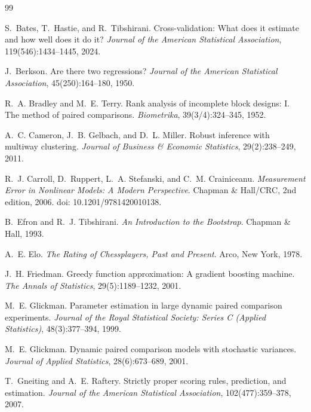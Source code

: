 \documentclass{article}
\begin{document}
\begin{thebibliography}{99}

S.~Bates, T.~Hastie, and R.~Tibshirani.
\newblock Cross-validation: What does it estimate and how well does it do it?
\newblock \emph{Journal of the American Statistical Association}, 119(546):1434--1445, 2024.

J.~Berkson.
\newblock Are there two regressions?
\newblock \emph{Journal of the American Statistical Association}, 45(250):164--180, 1950.

R.~A. Bradley and M.~E. Terry.
\newblock Rank analysis of incomplete block designs: I. The method of paired comparisons.
\newblock \emph{Biometrika}, 39(3/4):324--345, 1952.

A.~C. Cameron, J.~B. Gelbach, and D.~L. Miller.
\newblock Robust inference with multiway clustering.
\newblock \emph{Journal of Business \& Economic Statistics}, 29(2):238--249, 2011.

R.~J. Carroll, D.~Ruppert, L.~A. Stefanski, and C.~M. Crainiceanu.
\newblock \emph{Measurement Error in Nonlinear Models: A Modern Perspective}.
\newblock Chapman \& Hall/CRC, 2nd edition, 2006. doi: 10.1201/9781420010138.

B.~Efron and R.~J. Tibshirani.
\newblock \emph{An Introduction to the Bootstrap}.
\newblock Chapman \& Hall, 1993.

A.~E. Elo.
\newblock \emph{The Rating of Chessplayers, Past and Present}.
\newblock Arco, New York, 1978.

J.~H. Friedman.
\newblock Greedy function approximation: A gradient boosting machine.
\newblock \emph{The Annals of Statistics}, 29(5):1189--1232, 2001.

M.~E. Glickman.
\newblock Parameter estimation in large dynamic paired comparison experiments.
\newblock \emph{Journal of the Royal Statistical Society: Series C (Applied Statistics)}, 48(3):377--394, 1999.

M.~E. Glickman.
\newblock Dynamic paired comparison models with stochastic variances.
\newblock \emph{Journal of Applied Statistics}, 28(6):673--689, 2001.

T.~Gneiting and A.~E. Raftery.
\newblock Strictly proper scoring rules, prediction, and estimation.
\newblock \emph{Journal of the American Statistical Association}, 102(477):359--378, 2007.


\end{thebibliography}
\end{document}

